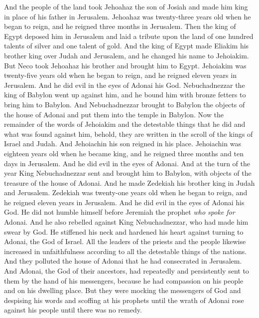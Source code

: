 \begin{biblechapter} %
 And the people of the land took Jehoahaz the son of Josiah and made him king in place of his father in Jerusalem.
\verse Jehoahaz was twenty-three years old when he began to reign, and he reigned three months in Jerusalem.
\verse Then the king of Egypt deposed him in Jerusalem and laid a tribute upon the land of one hundred talents of silver and one talent of gold.
\verse And the king of Egypt made Eliakim his brother king over Judah and Jerusalem, and he changed his name to Jehoiakim. But Neco took Jehoahaz his brother and brought him to Egypt.
\verse Jehoiakim was twenty-five years old when he began to reign, and he reigned eleven years in Jerusalem. And he did evil in the eyes of Adonai his God.
\verse Nebuchadnezzar the king of Babylon went up against him, and he bound him with bronze fetters to bring him to Babylon.
\verse And Nebuchadnezzar brought to Babylon the objects of the house of Adonai and put them into the temple in Babylon.
\verse Now the remainder of the words of Jehoiakim and the detestable things that he did and what was found against him, behold, they are written in the scroll of the kings of Israel and Judah. And Jehoiachin his son reigned in his place.
\verse Jehoiachin was eighteen years old when he became king, and he reigned three months and ten days in Jerusalem. And he did evil in the eyes of Adonai.
\verse And at the turn of the year King Nebuchadnezzar sent and brought him to Babylon, with objects of the treasure of the house of Adonai. And he made Zedekiah his brother king in Judah and Jerusalem.
\verse Zedekiah was twenty-one years old when he began to reign, and he reigned eleven years in Jerusalem.
\verse And he did evil in the eyes of Adonai his God. He did not humble himself before Jeremiah the prophet \textit{who spoke for} Adonai.
\verse And he also rebelled against King Nebuchadnezzar, who had made him swear by God. He stiffened his neck and hardened his heart against turning to Adonai, the God of Israel.
\verse All the leaders of the priests and the people likewise increased in unfaithfulness according to all the detestable things of the nations. And they polluted the house of Adonai that he had consecrated in Jerusalem.
\verse And Adonai, the God of their ancestors, had repeatedly and persistently sent to them by the hand of his messengers, because he had compassion on his people and on his dwelling place.
\verse But they were mocking the messengers of God and despising his words and scoffing at his prophets until the wrath of Adonai rose against his people until there was no remedy.

\end{biblechapter}

